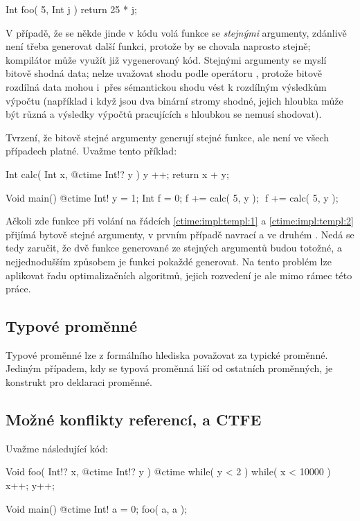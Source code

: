 \begin{code}
Int foo( 5, Int j ) {
	return 25 * j;
}
\end{code}

V případě, že se někde jinde v kódu volá funkce  se \textit{stejnými} \ctime argumenty, zdánlivě není třeba generovat další funkci, protože by se chovala naprosto stejně; kompilátor může využít již vygenerovaný kód. Stejnými \ctime argumenty se myslí bitově shodná data; nelze uvažovat shodu podle operátoru \inlineCode{==}, protože bitově rozdílná data mohou i~přes sémantickou shodu vést k rozdílným výsledkům výpočtu (například i když jsou dva binární stromy shodné, jejich hloubka může být různá a výsledky výpočtů pracujících s hloubkou se nemusí shodovat).

Tvrzení, že bitově stejné \ctime argumenty generují stejné funkce, ale není ve všech případech platné. Uvažme tento příklad:
\begin{code}
Int calc( Int x, @ctime Int!? y ) {
	y ++;
	return x + y;
}

Void main() {
	@ctime Int! y = 1;
	Int f = 0;
	f += calc( 5, y ); $\label{ctime:impl:templ:1}$
	f += calc( 5, y ); $\label{ctime:impl:templ:2}$
}
\end{code}

Ačkoli zde funkce  při volání na řádcích \ref{ctime:impl:templ:1} a \ref{ctime:impl:templ:2} přijímá bytově stejné \ctime argumenty, v prvním případě navrací  a ve druhém . Nedá se tedy zaručit, že dvě funkce generované ze stejných \ctime argumentů budou totožné, a nejjednodušším způsobem je funkci pokaždé generovat. Na tento problém lze aplikovat řadu optimalizačních algoritmů, jejich rozvedení je ale mimo rámec této práce.

\subsection{Typové proměnné}
Typové proměnné lze z formálního hlediska považovat za typické \ctime proměnné. Jediným případem, kdy se typová proměnná liší od ostatních \ctime proměnných, je konstrukt pro deklaraci proměnné.

\subsection{Možné konflikty referencí, \ctime a CTFE}
Uvažme následující kód:
\begin{code}
Void foo( Int!? x, @ctime Int!? y ) {
	@ctime while( y < 2 ) {
		while( x < 10000 ) $\label{ctime:ctfeConflict:2}$
			x++;
		y++;
	}
}

Void main() {
	@ctime Int! a = 0;
	foo( a, a ); $\label{ctime:ctfeConflict:1}$
}
\end{code}

